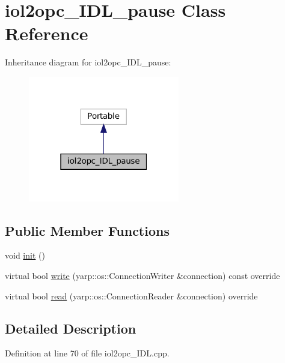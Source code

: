 \hypertarget{classiol2opc__IDL__pause}{}\section{iol2opc\+\_\+\+I\+D\+L\+\_\+pause Class Reference}
\label{classiol2opc__IDL__pause}


Inheritance diagram for iol2opc\+\_\+\+I\+D\+L\+\_\+pause\+:
\nopagebreak
\begin{figure}[H]
\begin{center}
\leavevmode
\includegraphics[width=187pt]{classiol2opc__IDL__pause__inherit__graph}
\end{center}
\end{figure}
\subsection*{Public Member Functions}
\begin{DoxyCompactItemize}
\item 
void \hyperlink{classiol2opc__IDL__pause_a5d62b34689c2bb826756479dfe8b382a}{init} ()
\item 
virtual bool \hyperlink{classiol2opc__IDL__pause_a573548bb7abe548ebb7b2e07ddc27291}{write} (yarp\+::os\+::\+Connection\+Writer \&connection) const override
\item 
virtual bool \hyperlink{classiol2opc__IDL__pause_a3cec64bee9a39ae47f9da8e85aaa36c6}{read} (yarp\+::os\+::\+Connection\+Reader \&connection) override
\end{DoxyCompactItemize}


\subsection{Detailed Description}


Definition at line 70 of file iol2opc\+\_\+\+I\+D\+L.\+cpp.



